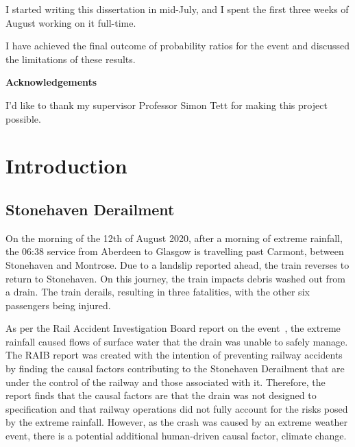 \documentclass[12pt,a4paper,oneside]{report}
\begin{document}
I started writing this dissertation in mid-July, and I spent the first
three weeks of August working on it full-time.

I have achieved the final outcome of probability ratios for the event and
    discussed the limitations of these results.


\newpage

\begin{center}
\textbf{Acknowledgements}
\end{center}

I'd like to thank my supervisor Professor Simon Tett for
making this project possible.



\tableofcontents
\listoftables
\listoffigures


\chapter{Introduction}\label{ch:intro}

\section{Stonehaven Derailment}\label{sec:stonederail}

On the morning of the 12th of August 2020,
    after a morning of extreme rainfall,
    the 06:38 service from Aberdeen to Glasgow is travelling past Carmont,
    between Stonehaven and Montrose.
Due to a landslip reported ahead,
    the train reverses to return to Stonehaven.
On this journey,
    the train impacts debris washed out from a drain.
The train derails,
    resulting in three fatalities,
    with the other six passengers being injured.

As per the Rail Accident Investigation Board report on the event~\cite{RAIB_2022},
    the extreme rainfall caused flows of surface water that the drain was unable to safely manage.
The RAIB report was created with the intention of preventing railway accidents by finding the causal
    factors contributing to the Stonehaven Derailment that are under the control of the railway
    and those associated with it.
Therefore,
    the report finds that the causal factors are that the drain was not designed to specification
    and that railway operations did not fully account for the risks posed by the extreme rainfall.
However,
    as the crash was caused by an extreme weather event,
    there is a potential additional human-driven causal factor, climate change.
\end{document}
